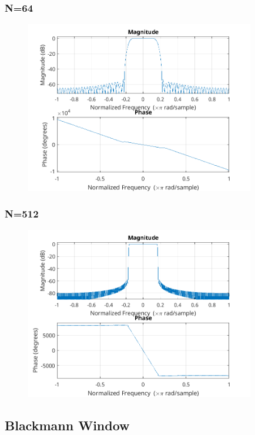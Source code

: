 \documentclass{article}
\begin{document}
  \subsubsection{N=64}
  \begin{figure}[!ht]
  \includegraphics[width=10cm]{freqz_ham_64.png}
  \end{figure}

  \subsubsection{N=512}
  \begin{figure}[!ht]
  \includegraphics[width=10cm]{freqz_ham_512.png}
  \end{figure}

\subsection{Blackmann Window}
\end{document}
